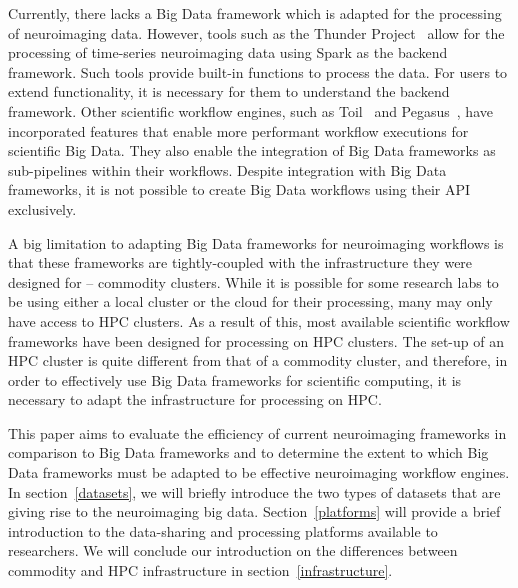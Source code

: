         Currently, there lacks a Big Data framework which is adapted for the
        processing of neuroimaging data. However, tools such as the Thunder 
        Project~\cite{Freeman:2014aa} allow for the processing of time-series
        neuroimaging data using Spark as the backend framework. Such tools
        provide built-in functions to process the data. For users to 
        extend functionality, it is necessary for them to understand the 
        backend framework. Other scientific workflow engines, such as 
        Toil~\cite{Vivian:2017aa} and Pegasus~\cite{DEELMAN201517}, have 
        incorporated features that enable more 
        performant workflow executions for scientific Big Data. They also enable
        the integration of Big Data frameworks as sub-pipelines within their 
        workflows. Despite integration with Big Data frameworks, it is not
        possible to create Big Data workflows using their API exclusively.

        A big limitation to adapting Big Data frameworks for neuroimaging 
        workflows is that these frameworks are tightly-coupled with the 
        infrastructure they were designed for -- commodity clusters. While
        it is possible for some research labs to be using either a local cluster
        or the cloud for their processing, many may only have access to HPC
        clusters. As a result of this, most available scientific workflow 
        frameworks have been designed for processing on HPC clusters. The 
        set-up of an HPC cluster is quite different from that of a commodity 
        cluster, and therefore, in order to effectively use Big Data frameworks
        for scientific computing, it is necessary to adapt the infrastructure 
        for processing on HPC.

        This paper aims to evaluate the efficiency of current neuroimaging 
        frameworks in comparison to Big Data frameworks and to determine the 
        extent to which Big Data frameworks must be adapted to be effective
        neuroimaging workflow engines. 
        In section~\ref{datasets}, we will briefly introduce the two 
        types of datasets that are giving rise to the neuroimaging big 
        data. Section~\ref{platforms} will provide a brief introduction 
        to the data-sharing and processing platforms available to 
        researchers. We will conclude our 
        introduction on the differences between commodity and HPC infrastructure
        in section~\ref{infrastructure}.

